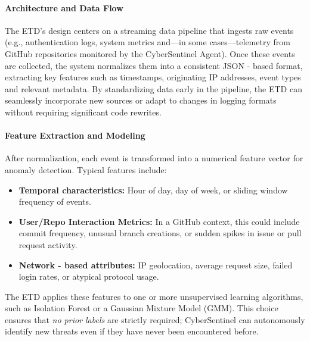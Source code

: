 \documentclass{article}
\begin{document}
\paragraph{Architecture and Data Flow}
The ETD’s design centers on a streaming data pipeline that ingests raw events (e.g., authentication logs, system metrics and—in some cases—telemetry from GitHub repositories monitored by the CyberSentinel Agent). Once these events are collected, the system normalizes them into a consistent JSON - based format, extracting key features such as timestamps, originating IP addresses, event types and relevant metadata. By standardizing data early in the pipeline, the ETD can seamlessly incorporate new sources or adapt to changes in logging formats without requiring significant code rewrites.

\paragraph{Feature Extraction and Modeling}
After normalization, each event is transformed into a numerical feature vector for anomaly detection. Typical features include:
\begin{itemize}
    \item \textbf{Temporal characteristics:} Hour of day, day of week, or sliding window frequency of events.
    \item \textbf{User/Repo Interaction Metrics:} In a GitHub context, this could include commit frequency, unusual branch creations, or sudden spikes in issue or pull request activity.
    \item \textbf{Network - based attributes:} IP geolocation, average request size, failed login rates, or atypical protocol usage.
\end{itemize}
The ETD applies these features to one or more unsupervised learning algorithms, such as Isolation Forest or a Gaussian Mixture Model (GMM). This choice ensures that \emph{no prior labels} are strictly required; CyberSentinel can autonomously identify new threats even if they have never been encountered before.
\end{document}
